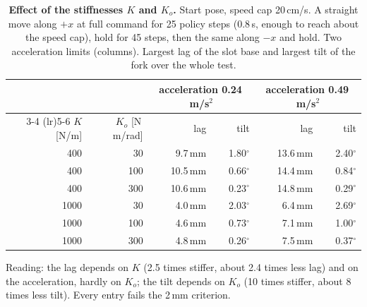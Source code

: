 \begin{table}[h]
  \centering
  \caption{\textbf{Effect of the stiffnesses $K$ and $K_o$.} Start pose, speed cap 20\,cm/s. A straight move along $+x$
  at full command for 25 policy steps (0.8\,s, enough to reach about the speed cap), hold for 45 steps, then the same
  along $-x$ and hold. Two acceleration limits (columns). Largest lag of the slot base and largest tilt of the fork
  over the whole test.}
  \label{tab:al-diag}
  {\renewcommand{\arraystretch}{1.15}
  \begin{tabular}{rrrrrr}
    \toprule
    & & \multicolumn{2}{c}{acceleration 0.24\,m/s$^2$} & \multicolumn{2}{c}{acceleration 0.49\,m/s$^2$} \\
    \cmidrule(lr){3-4} \cmidrule(lr){5-6}
    $K$ [N/m] & $K_o$ [N\,m/rad] & lag & tilt & lag & tilt \\
    \midrule
    400  & 30  & 9.7\,mm  & 1.80$^\circ$ & 13.6\,mm & 2.40$^\circ$ \\
    400  & 100 & 10.5\,mm & 0.66$^\circ$ & 14.4\,mm & 0.84$^\circ$ \\
    400  & 300 & 10.6\,mm & 0.23$^\circ$ & 14.8\,mm & 0.29$^\circ$ \\
    1000 & 30  & 4.0\,mm  & 2.03$^\circ$ & 6.4\,mm  & 2.69$^\circ$ \\
    1000 & 100 & 4.6\,mm  & 0.73$^\circ$ & 7.1\,mm  & 1.00$^\circ$ \\
    1000 & 300 & 4.8\,mm  & 0.26$^\circ$ & 7.5\,mm  & 0.37$^\circ$ \\
    \bottomrule
  \end{tabular}}

  \smallskip
  {\small Reading: the lag depends on $K$ (2.5 times stiffer, about 2.4 times less lag) and on the acceleration, hardly
  on $K_o$; the tilt depends on $K_o$ (10 times stiffer, about 8 times less tilt). Every entry fails the 2\,mm criterion.}
\end{table}

